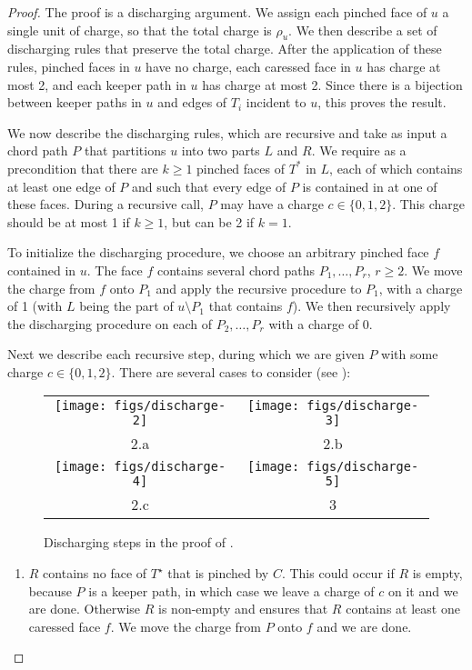 \documentclass{patmorin}
\newcommand{\dual}[1]{{#1}^\star}
\begin{document}
\begin{proof}
   The proof is a discharging argument.  We assign each pinched face of
   $u$ a single unit of charge, so that the total charge is $\rho_u$.
   We then describe a set of discharging rules that preserve the total
   charge.  After the application of these rules, pinched faces in $u$
   have no charge, each caressed face in $u$ has charge at most 2,
   and each keeper path in $u$ has charge at most 2.  Since there is a
   bijection between keeper paths in $u$ and edges of $T_i$ incident to
   $u$, this proves the result.

   We now describe the discharging rules, which are recursive and take as
   input a chord path $P$ that partitions $u$ into two parts $L$ and $R$.
   We require as a precondition that there are $k\ge 1$ pinched faces
   of $T^*$ in $L$, each of which contains at least one edge of $P$ and
   such that every edge of $P$ is contained in at one of these faces.
   During a recursive call, $P$ may have a charge $c\in\{0,1,2\}$. This
   charge should be at most 1 if $k\ge 1$, but can be 2 if $k=1$.

   To initialize the discharging procedure, we choose an arbitrary pinched
   face $f$ contained in $u$.  The face $f$ contains several chord paths
   $P_1,\ldots,P_r$, $r\ge 2$.  We move the charge from $f$ onto $P_1$
   and apply the recursive procedure to $P_1$, with a charge of 1 (with
   $L$ being the part of $u\setminus P_1$ that contains $f$).  We then
   recursively apply the discharging procedure on each of $P_2,\ldots,P_r$
   with a charge of 0.

   Next we describe each recursive step, during which we are given $P$
   with some charge $c\in\{0,1,2\}$.  There are several cases to consider
   (see ):
	\begin{figure}
		\begin{center}
		\begin{tabular}{cc}
			\texttt{[image: figs/discharge-2]} &
			\texttt{[image: figs/discharge-3]} \\
			 2.a & 2.b \\[1.5em]
			\texttt{[image: figs/discharge-4]} &
			\texttt{[image: figs/discharge-5]} \\
			 2.c & 3 
		\end{tabular}
		\end{center}
		\caption{Discharging steps in the proof of .}
	\end{figure}
  \begin{enumerate}
     \item $R$ contains no face of $\dual{T}$ that is pinched by $C$.
     This could occur if $R$ is empty, because $P$ is a keeper path,
     in which case we leave a charge of $c$ on it and we are done.
     Otherwise $R$ is non-empty and   ensures that
     $R$ contains at least one caressed face $f$.  We move the charge
     from $P$ onto $f$ and we are done.


\end{enumerate}
\end{proof}
\end{document}
